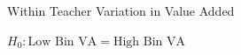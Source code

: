 \documentclass[t,aspectratio=169,11pt,presentation]{beamer}
\begin{document}
\begin{frame}[label=example]{Within Teacher Variation in Value Added}

    \centering
    $H_0: \text{Low Bin VA} = \text{High Bin VA}$
    \resizebox{.8\textwidth}{!}{}

\hyperlink{het1}{}
\end{frame}







\end{document}
